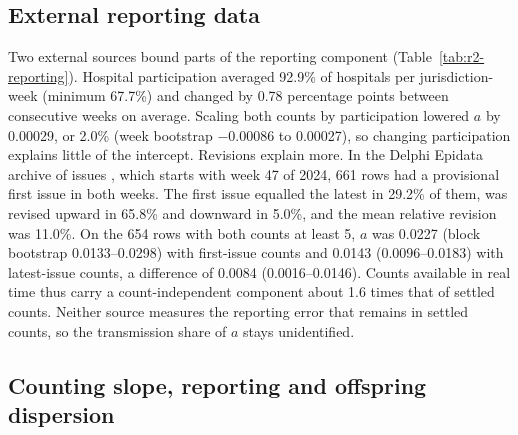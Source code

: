 

\subsection{External reporting data}
\label{sec:res-reporting}

Two external sources bound parts of the reporting component (Table~\ref{tab:r2-reporting}). Hospital participation averaged 92.9\% of hospitals per jurisdiction-week (minimum 67.7\%) and changed by 0.78 percentage points between consecutive weeks on average. Scaling both counts by participation lowered $a$ by 0.00029, or 2.0\% (week bootstrap $-0.00086$ to 0.00027), so changing participation explains little of the intercept. Revisions explain more. In the Delphi Epidata archive of issues \citep{reinhart2021open}, which starts with week 47 of 2024, 661 rows had a provisional first issue in both weeks. The first issue equalled the latest in 29.2\% of them, was revised upward in 65.8\% and downward in 5.0\%, and the mean relative revision was 11.0\%. On the 654 rows with both counts at least 5, $a$ was 0.0227 (block bootstrap 0.0133--0.0298) with first-issue counts and 0.0143 (0.0096--0.0183) with latest-issue counts, a difference of 0.0084 (0.0016--0.0146). Counts available in real time thus carry a count-independent component about 1.6 times that of settled counts. Neither source measures the reporting error that remains in settled counts, so the transmission share of $a$ stays unidentified.



\subsection{Counting slope, reporting and offspring dispersion}
\label{sec:res-slope}

